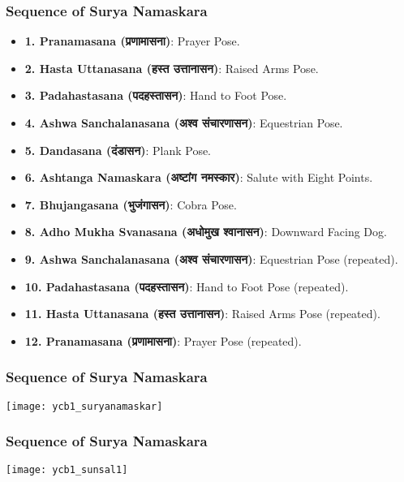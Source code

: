 \begin{frame}[fragile]\frametitle{Sequence of Surya Namaskara}

      \begin{itemize}
        \item \textbf{1. Pranamasana (प्रणामासना)}: Prayer Pose.
        \item \textbf{2. Hasta Uttanasana (हस्त उत्तानासन)}: Raised Arms Pose.
        \item \textbf{3. Padahastasana (पदहस्तासन)}: Hand to Foot Pose.
        \item \textbf{4. Ashwa Sanchalanasana (अश्व संचारणासन)}: Equestrian Pose.
        \item \textbf{5. Dandasana (दंडासन)}: Plank Pose.
        \item \textbf{6. Ashtanga Namaskara (अष्टांग नमस्कार)}: Salute with Eight Points.
        \item \textbf{7. Bhujangasana (भुजंगासन)}: Cobra Pose.
        \item \textbf{8. Adho Mukha Svanasana (अधोमुख श्वानासन)}: Downward Facing Dog.
        \item \textbf{9. Ashwa Sanchalanasana (अश्व संचारणासन)}: Equestrian Pose (repeated).
        \item \textbf{10. Padahastasana (पदहस्तासन)}: Hand to Foot Pose (repeated).
        \item \textbf{11. Hasta Uttanasana (हस्त उत्तानासन)}: Raised Arms Pose (repeated).
        \item \textbf{12. Pranamasana (प्रणामासना)}: Prayer Pose (repeated).
      \end{itemize}
 
\end{frame}


\begin{frame}[fragile]\frametitle{Sequence of Surya Namaskara}

        \begin{center}
        \texttt{[image: ycb1\_suryanamaskar]}
        \end{center}	

\end{frame}

\begin{frame}[fragile]\frametitle{Sequence of Surya Namaskara}

        \begin{center}
        \texttt{[image: ycb1\_sunsal1]}
		
        \end{center}	
		

\end{frame}

